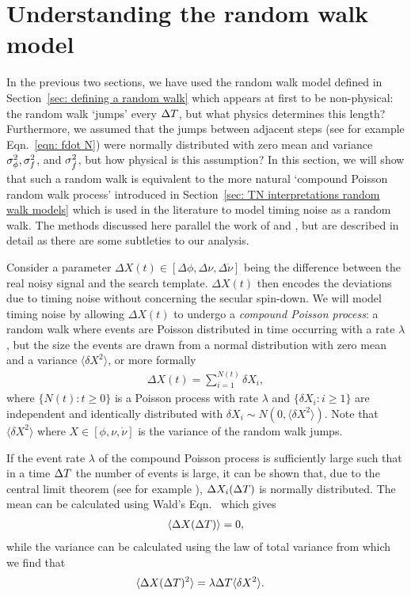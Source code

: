 \documentclass[../full_thesis/full_thesis.tex]{subfiles}
\begin{document}
\section{Understanding the random walk model}
\label{sec: understanding the random walk model}

In the previous two sections, we have used the random walk model
defined in Section~\ref{sec: defining a random walk} which appears at first to
be non-physical: the random walk `jumps' every $\Delta T$, but what
physics determines this length? Furthermore, we assumed that the jumps between
adjacent steps (see for example Eqn.~\eqref{eqn: fdot N}) were normally
distributed with zero mean and variance $\sigma_{\phi}^{2}, \sigma_{f}^{2}$, and $\sigma_{\dot{f}}^{2}$, but how
physical is this assumption?
In this section, we will show that such a
random walk is equivalent to the more natural `compound Poisson random walk
process' introduced in Section~\ref{sec: TN interpretations random walk models}
which is used in the literature to model timing noise as a random walk.  The
methods discussed here parallel the work of \citet{Cordes1980} and
\citet{Groth1975}, but are described in detail as there are some subtleties to
our analysis.

Consider a parameter $\Delta X(t) \in [\Delta\phi, \Delta\nu,\Delta\dot{\nu}]$ being
the difference between the real noisy signal and the search template. $\Delta
X(t)$ then encodes the deviations due to timing noise without concerning the
secular spin-down.  We will model timing noise by allowing $\Delta X(t)$ to
undergo a \emph{compound Poisson process}: a random walk where events are
Poisson distributed in time occurring with a rate $\lambda$, but the size the
events are drawn from a normal distribution with zero mean and a variance
$\langle \delta X^{2} \rangle$, or more formally
\begin{align}
\Delta X(t) = \sum_{i=1}^{N(t)} \delta X_i,
\label{eqn: X def}
\end{align}
where $\{ N(t): t \ge 0\}$ is a Poisson process with rate $\lambda$ and
$\{\delta X_i: i \ge 1\}$ are independent and identically distributed with
$\delta X_i \sim N(0, \langle \delta X^{2}\rangle)$. Note that $\langle \delta X^{2} \rangle$
where $X \in [\phi, \nu, \dot{\nu}]$ is the variance of the random walk jumps.

If the event rate $\lambda$ of the compound Poisson process is sufficiently
large such that in a time $\Delta T$ the number of events is large, it can be shown
that, due to the central limit theorem
(see for example \citet{weiss2006course}), $\Delta X_i(\Delta T)$ is normally
distributed. The mean can be calculated using Wald's
Eqn.~\citep{wald1944cumulative} which gives
\begin{align}
\langle \Delta X(\Delta T) \rangle = 0,
\label{eqn: DX mean}
\end{align}
while the variance can be calculated using the law of total variance
\citep{weiss2006course} from which we find that
\begin{align}
\langle \Delta X(\Delta T)^{2} \rangle &  = \lambda \Delta T \langle \delta X^{2}\rangle.
\label{eqn: DX var}
\end{align}
\end{document}
